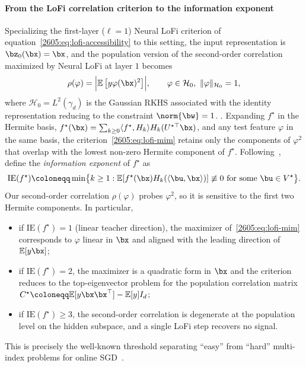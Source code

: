 \paragraph{From the LoFi correlation criterion to the information exponent}
Specializing the first-layer ($\ell=1$) Neural LoFi criterion of equation~\eqref{2605:eq:lofi-accessibility} to this setting, the input representation is $\bz_0(\bx)=\bx$, and the population version of the second-order correlation maximized by Neural LoFi at layer $1$ becomes
\begin{equation}\label{2605:eq:lofi-mim}
\rho(\varphi)
 = 
\Bigl| \mathbb{E} \left[y \varphi(\bx)^2\right]\Bigr|,
\qquad
\varphi\in\mathcal{H}_0,\ \|\varphi\|_{\mathcal{H}_0}=1,
\end{equation}
where $\mathcal{H}_0=L^2(\gamma_d)$ is the Gaussian RKHS associated with the identity representation reducing to the constraint $\norm{\bw}=1$.
. Expanding $f^\star$ in the Hermite basis, $f^\star(\bx)=\sum_{k\ge 0}\langle f^\star,H_k\rangle H_k(U^{\star\top}\bx)$, and any test feature $\varphi$ in the same basis, the criterion~\eqref{2605:eq:lofi-mim} retains only the components of $\varphi^2$ that overlap with the lowest non-zero Hermite component of $f^\star$. Following~\cite{benarous2024stochastic}, define the \emph{information exponent} of $f^\star$ as
\begin{equation}\label{2605:eq:ie-def}
\mathrm{IE}(f^\star)
 \coloneqq 
\min\bigl\{ k\ge 1  :  \mathbb{E}[f^\star(\bx) H_k(\langle \bu,\bx\rangle)]\not\equiv 0 \text{ for some } \bu\in V^\star \bigr\}.
\end{equation}
Our second-order correlation $\rho(\varphi)$ probes $\varphi^2$, so it is sensitive to the first two Hermite components. In particular,
\begin{itemize}
    \item if $\mathrm{IE}(f^\star)=1$ (linear teacher direction), the maximizer of~\eqref{2605:eq:lofi-mim} corresponds to $\varphi$ linear in $\bx$ and aligned with the leading direction of $\mathbb{E}[y\bx]$;
        \item if $\mathrm{IE}(f^\star)=2$, the maximizer is a quadratic form in $\bx$ and the criterion reduces to the top-eigenvector problem for the population correlation matrix $C^\star\coloneqq \mathbb{E}[y \bx\bx^\top] - \mathbb{E}[y] I_d$;
            \item if $\mathrm{IE}(f^\star)\ge 3$, the second-order correlation is degenerate at the population level on the hidden subspace, and a single LoFi step recovers no signal.
            \end{itemize}
            This is precisely the well-known threshold separating ``easy'' from ``hard'' multi-index problems for online SGD~\cite{benarous2024stochastic,bietti2022learning,abbe2021staircase,damian2024computational}.

